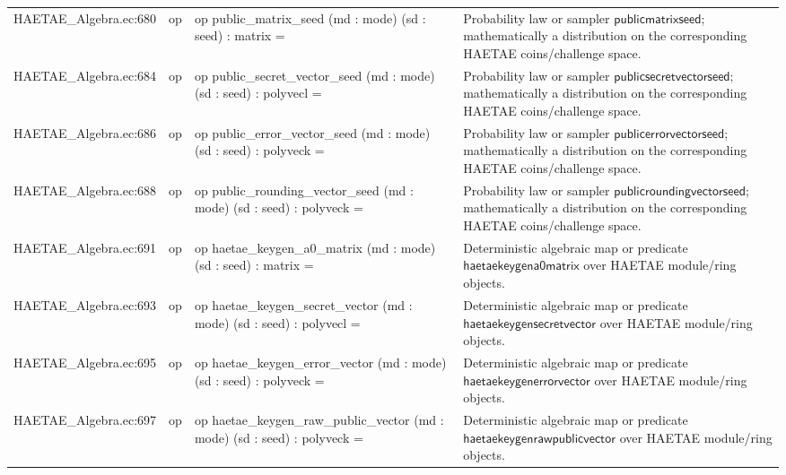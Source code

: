 \documentclass[10pt]{article}
\begin{document}
\begin{longtable}{L{0.11\textwidth}L{0.055\textwidth}L{0.385\textwidth}L{0.41\textwidth}}
HAETAE\_\allowbreak{}Algebra.\allowbreak{}ec:\allowbreak{}680 & op & {\ttfamily\scriptsize op public\_\allowbreak{}matrix\_\allowbreak{}seed (md : mode) (sd : seed) : matrix =} & Probability law or sampler $\mathsf{publicmatrixseed}$; mathematically a distribution on the corresponding HAETAE coins/challenge space. \\
HAETAE\_\allowbreak{}Algebra.\allowbreak{}ec:\allowbreak{}684 & op & {\ttfamily\scriptsize op public\_\allowbreak{}secret\_\allowbreak{}vector\_\allowbreak{}seed (md : mode) (sd : seed) : polyvecl =} & Probability law or sampler $\mathsf{publicsecretvectorseed}$; mathematically a distribution on the corresponding HAETAE coins/challenge space. \\
HAETAE\_\allowbreak{}Algebra.\allowbreak{}ec:\allowbreak{}686 & op & {\ttfamily\scriptsize op public\_\allowbreak{}error\_\allowbreak{}vector\_\allowbreak{}seed (md : mode) (sd : seed) : polyveck =} & Probability law or sampler $\mathsf{publicerrorvectorseed}$; mathematically a distribution on the corresponding HAETAE coins/challenge space. \\
HAETAE\_\allowbreak{}Algebra.\allowbreak{}ec:\allowbreak{}688 & op & {\ttfamily\scriptsize op public\_\allowbreak{}rounding\_\allowbreak{}vector\_\allowbreak{}seed (md : mode) (sd : seed) : polyveck =} & Probability law or sampler $\mathsf{publicroundingvectorseed}$; mathematically a distribution on the corresponding HAETAE coins/challenge space. \\
HAETAE\_\allowbreak{}Algebra.\allowbreak{}ec:\allowbreak{}691 & op & {\ttfamily\scriptsize op haetae\_\allowbreak{}keygen\_\allowbreak{}a0\_\allowbreak{}matrix (md : mode) (sd : seed) : matrix =} & Deterministic algebraic map or predicate $\mathsf{haetaekeygena0matrix}$ over HAETAE module/ring objects. \\
HAETAE\_\allowbreak{}Algebra.\allowbreak{}ec:\allowbreak{}693 & op & {\ttfamily\scriptsize op haetae\_\allowbreak{}keygen\_\allowbreak{}secret\_\allowbreak{}vector (md : mode) (sd : seed) : polyvecl =} & Deterministic algebraic map or predicate $\mathsf{haetaekeygensecretvector}$ over HAETAE module/ring objects. \\
HAETAE\_\allowbreak{}Algebra.\allowbreak{}ec:\allowbreak{}695 & op & {\ttfamily\scriptsize op haetae\_\allowbreak{}keygen\_\allowbreak{}error\_\allowbreak{}vector (md : mode) (sd : seed) : polyveck =} & Deterministic algebraic map or predicate $\mathsf{haetaekeygenerrorvector}$ over HAETAE module/ring objects. \\
HAETAE\_\allowbreak{}Algebra.\allowbreak{}ec:\allowbreak{}697 & op & {\ttfamily\scriptsize op haetae\_\allowbreak{}keygen\_\allowbreak{}raw\_\allowbreak{}public\_\allowbreak{}vector (md : mode) (sd : seed) : polyveck =} & Deterministic algebraic map or predicate $\mathsf{haetaekeygenrawpublicvector}$ over HAETAE module/ring objects. \\

\end{longtable}
\end{document}
